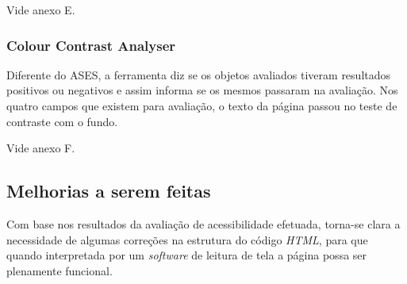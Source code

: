     Vide anexo E.
    
    \subsubsection{Colour Contrast Analyser}
    
    Diferente do ASES, a ferramenta diz se os objetos avaliados
    tiveram resultados positivos ou negativos e assim informa se os mesmos passaram na 
    avaliação. Nos quatro campos que existem para avaliação, o texto da página passou no teste 
    de contraste com o fundo.
    
    Vide anexo F.
    
    \subsection{Melhorias a serem feitas}
    
    Com base nos resultados da avaliação de acessibilidade efetuada, torna-se clara a
    necessidade de algumas correções na estrutura do código \textit{HTML},  para que quando 
    interpretada por um \textit{software} de leitura de tela a página possa ser plenamente funcional.